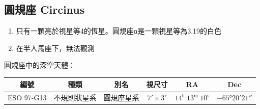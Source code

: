 \subsection{圓規座 Circinus}
\begin{enumerate}
    \item 只有一顆亮於視星等4的恆星。圓規座α是一顆視星等為3.19的白色
    \item 在半人馬座下，無法觀測
\end{enumerate}
圓規座中的深空天體：

\begin{center}
\begin{longtable}{c | c | c | c | c | c}
    編號 & 種類 & 別名 & 視尺寸 & RA & Dec \\
    \hline
    \endfirsthead


    \endfoot

    \endlastfoot

    ESO 97-G13 & 不規則狀星系 & 圓規座星系 & \(\ang{;7;}\times\ang{;3;}\) & \(14^\text{h }13^\text{m }10^\text{s}\) & \(-\ang{65;20;21}\) \\
\end{longtable}
\end{center}